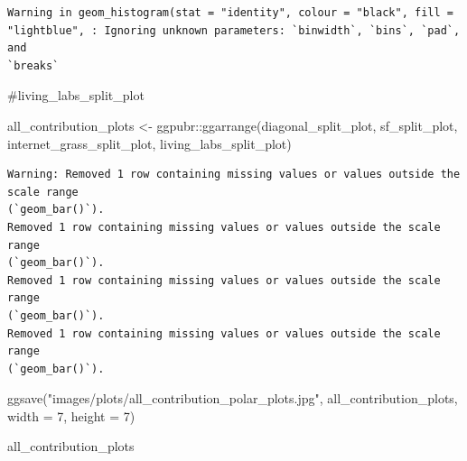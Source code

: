\documentclass[
  letterpaper,
]{report}
\newenvironment{Shaded}{\begin{snugshade}}{\end{snugshade}}
\newcommand{\AttributeTok}[1]{\textcolor[rgb]{0.40,0.45,0.13}{#1}}
\newcommand{\CommentTok}[1]{\textcolor[rgb]{0.37,0.37,0.37}{#1}}
\newcommand{\DecValTok}[1]{\textcolor[rgb]{0.68,0.00,0.00}{#1}}
\newcommand{\FunctionTok}[1]{\textcolor[rgb]{0.28,0.35,0.67}{#1}}
\newcommand{\NormalTok}[1]{\textcolor[rgb]{0.00,0.23,0.31}{#1}}
\newcommand{\OtherTok}[1]{\textcolor[rgb]{0.00,0.23,0.31}{#1}}
\newcommand{\SpecialCharTok}[1]{\textcolor[rgb]{0.37,0.37,0.37}{#1}}
\newcommand{\StringTok}[1]{\textcolor[rgb]{0.13,0.47,0.30}{#1}}
\begin{document}
\begin{verbatim}
Warning in geom_histogram(stat = "identity", colour = "black", fill =
"lightblue", : Ignoring unknown parameters: `binwidth`, `bins`, `pad`, and
`breaks`
\end{verbatim}

\begin{Shaded}
\begin{Highlighting}[]
\CommentTok{\#living\_labs\_split\_plot}
\end{Highlighting}
\end{Shaded}

\begin{Shaded}
\begin{Highlighting}[]
\NormalTok{all\_contribution\_plots }\OtherTok{\textless{}{-}}\NormalTok{ ggpubr}\SpecialCharTok{::}\FunctionTok{ggarrange}\NormalTok{(diagonal\_split\_plot, }
\NormalTok{                                            sf\_split\_plot, }
\NormalTok{                                            internet\_grass\_split\_plot, }
\NormalTok{                                            living\_labs\_split\_plot)}
\end{Highlighting}
\end{Shaded}

\begin{verbatim}
Warning: Removed 1 row containing missing values or values outside the scale range
(`geom_bar()`).
Removed 1 row containing missing values or values outside the scale range
(`geom_bar()`).
Removed 1 row containing missing values or values outside the scale range
(`geom_bar()`).
Removed 1 row containing missing values or values outside the scale range
(`geom_bar()`).
\end{verbatim}

\begin{Shaded}
\begin{Highlighting}[]
\FunctionTok{ggsave}\NormalTok{(}\StringTok{"images/plots/all\_contribution\_polar\_plots.jpg"}\NormalTok{, }
\NormalTok{       all\_contribution\_plots, }\AttributeTok{width =} \DecValTok{7}\NormalTok{, }
       \AttributeTok{height =} \DecValTok{7}\NormalTok{)}

\NormalTok{all\_contribution\_plots}
\end{Highlighting}
\end{Shaded}
\end{document}
